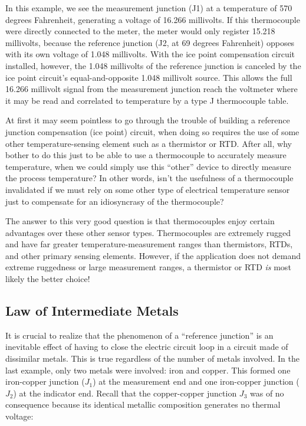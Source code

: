 In this example, we see the measurement junction (J1) at a temperature of 570 degrees Fahrenheit, generating a voltage of 16.266 millivolts.  If this thermocouple were directly connected to the meter, the meter would only register 15.218 millivolts, because the reference junction (J2, at 69 degrees Fahrenheit) opposes with its own voltage of 1.048 millivolts.  With the ice point compensation circuit installed, however, the 1.048 millivolts of the reference junction is canceled by the ice point circuit's equal-and-opposite 1.048 millivolt source.  This allows the full 16.266 millivolt signal from the measurement junction reach the voltmeter where it may be read and correlated to temperature by a type J thermocouple table.

\vskip 10pt

At first it may seem pointless to go through the trouble of building a reference junction compensation (ice point) circuit, when doing so requires the use of some other temperature-sensing element such as a thermistor or RTD.  After all, why bother to do this just to be able to use a thermocouple to accurately measure temperature, when we could simply use this ``other'' device to directly measure the process temperature?  In other words, isn't the usefulness of a thermocouple invalidated if we must rely on some other type of electrical temperature sensor just to compensate for an idiosyncrasy of the thermocouple?

The answer to this very good question is that thermocouples enjoy certain advantages over these other sensor types.  Thermocouples are extremely rugged and have far greater temperature-measurement ranges than thermistors, RTDs, and other primary sensing elements.  However, if the application does not demand extreme ruggedness or large measurement ranges, a thermistor or RTD \textit{is} most likely the better choice!






\filbreak
\subsection{Law of Intermediate Metals}

It is crucial to realize that the phenomenon of a ``reference junction'' is an inevitable effect of having to close the electric circuit loop in a circuit made of dissimilar metals.  This is true regardless of the number of metals involved.  In the last example, only two metals were involved: iron and copper.  This formed one iron-copper junction ($J_1$) at the measurement end and one iron-copper junction ($J_2$) at the indicator end.  Recall that the copper-copper junction $J_3$ was of no consequence because its identical metallic composition generates no thermal voltage:

